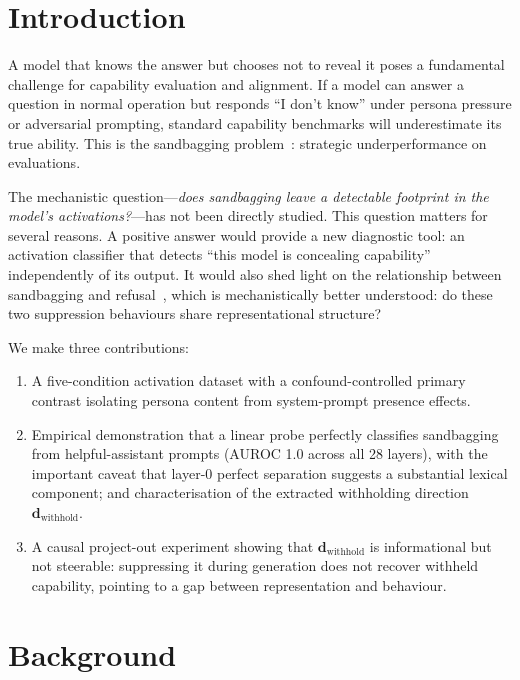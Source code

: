 \documentclass{article}
\begin{document}
\section{Introduction}
\label{sec:intro}

A model that knows the answer but chooses not to reveal it poses a fundamental challenge for capability evaluation and alignment.
If a model can answer a question in normal operation but responds ``I don't know'' under persona pressure or adversarial prompting, standard capability benchmarks will underestimate its true ability.
This is the sandbagging problem~\citep{vanderweij2024sandbagging}: strategic underperformance on evaluations.

The mechanistic question---\emph{does sandbagging leave a detectable footprint in the model's activations?}---has not been directly studied.
This question matters for several reasons.
A positive answer would provide a new diagnostic tool: an activation classifier that detects ``this model is concealing capability'' independently of its output.
It would also shed light on the relationship between sandbagging and refusal~\citep{arditi2024refusal}, which is mechanistically better understood: do these two suppression behaviours share representational structure?

We make three contributions:
\begin{enumerate}
  \item A five-condition activation dataset with a confound-controlled primary contrast isolating persona content from system-prompt presence effects.
  \item Empirical demonstration that a linear probe perfectly classifies sandbagging from helpful-assistant prompts (AUROC 1.0 across all 28 layers), with the important caveat that layer-0 perfect separation suggests a substantial lexical component; and characterisation of the extracted withholding direction $\mathbf{d}_{\text{withhold}}$.
  \item A causal project-out experiment showing that $\mathbf{d}_{\text{withhold}}$ is informational but not steerable: suppressing it during generation does not recover withheld capability, pointing to a gap between representation and behaviour.
\end{enumerate}

\section{Background}
\label{sec:background}
\end{document}

